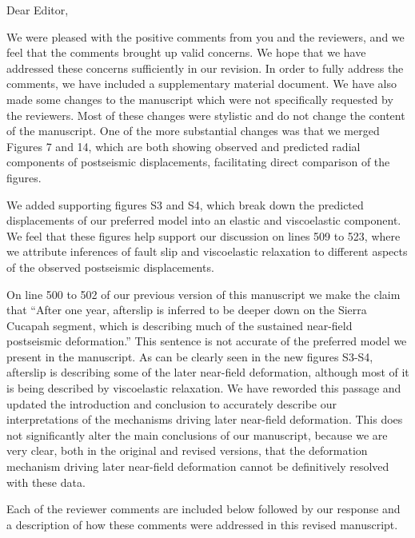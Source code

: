 \documentclass[10pt,a4paper]{letter}
\begin{document}
\signature{Trever T. Hines}

\begin{letter}{}
\opening{Dear Editor,}

We were pleased with the positive comments from you and the reviewers,
and we feel that the comments brought up valid concerns. We hope that
we have addressed these concerns sufficiently in our revision. In
order to fully address the comments, we have included a supplementary
material document.  We have also made some changes to the manuscript
which were not specifically requested by the reviewers.  Most of these
changes were stylistic and do not change the content of the
manuscript.  One of the more substantial changes was that we merged
Figures 7 and 14, which are both showing observed and predicted radial
components of postseismic displacements, facilitating direct
comparison of the figures.

We added supporting figures S3 and S4, which break down the predicted
displacements of our preferred model into an elastic and viscoelastic
component.  We feel that these figures help support our discussion on
lines 509 to 523, where we attribute inferences of fault slip and
viscoelastic relaxation to different aspects of the observed
postseismic displacements.

On line 500 to 502 of our previous version of this manuscript we make
the claim that “After one year, afterslip is inferred to be deeper
down on the Sierra Cucapah segment, which is describing much of the
sustained near-field postseismic deformation.” This sentence is not
accurate of the preferred model we present in the manuscript. As can
be clearly seen in the new figures S3-S4, afterslip is describing some
of the later near-field deformation, although most of it is being
described by viscoelastic relaxation.  We have reworded this passage
and updated the introduction and conclusion to accurately describe our
interpretations of the mechanisms driving later near-field
deformation.  This does not significantly alter the main conclusions
of our manuscript, because we are very clear, both in the original and
revised versions, that the deformation mechanism driving later
near-field deformation cannot be definitively resolved with these
data.

Each of the reviewer comments are included below followed by our
response and a description of how these comments were addressed in
this revised manuscript.



\end{letter}
\end{document}
